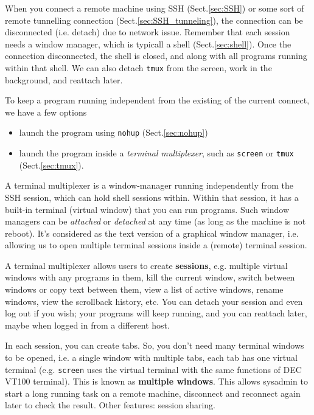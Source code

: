 When you connect a remote machine using SSH (Sect.\ref{sec:SSH}) or some sort of
remote tunnelling connection (Sect.\ref{sec:SSH_tunneling}), the connection can
be disconnected (i.e. detach) due to network issue. Remember that each session
needs a window manager, which is typicall a shell (Sect.\ref{sec:shell}). Once the connection
disconnected, the shell is closed, and along with all programs running within
that shell. We can also detach \verb!tmux! from the screen,
work in the background, and reattach later.
  

To keep a program running independent from the existing of the current connect,
we have a few options
\begin{itemize}
  \item launch the program using \verb!nohup! (Sect.\ref{sec:nohup})
  
  \item launch the program inside a {\it terminal multiplexer}, such as
  \verb!screen! or \verb!tmux! (Sect.\ref{sec:tmux}).
\end{itemize}

A terminal multiplexer is a window-manager running independently from the SSH
session, which can hold shell sessions within. Within that session, it has a
built-in terminal (virtual window) that you can run programs. Such window
managers can be {\it attached} or {\it detached} at any time (as long as the
machine is not reboot). It's considered as the text version of a graphical
window manager, i.e. allowing us to open multiple terminal sessions inside a
(remote) terminal session.

A terminal multiplexer allows users to create {\bf sessions}, e.g.
multiple virtual windows with any programs in them, kill the current window,
switch between windows or copy text between them, view a list of active windows,
rename windows, view the scrollback history, etc. You can detach your session
and even log out if you wish; your programs will keep running, and you can
reattach later, maybe when logged in from a different host.

In each session, you can create tabs. So, you don't need many terminal windows
to be opened, i.e. a single window with multiple tabs, each tab has one virtual
terminal (e.g. \verb!screen! uses the virtual terminal with the same functions
of DEC VT100 terminal). This is known as {\bf multiple windows}. This allows
sysadmin to start a long running task on a remote machine, disconnect and
reconnect again later to check the result.
Other features: session sharing.

